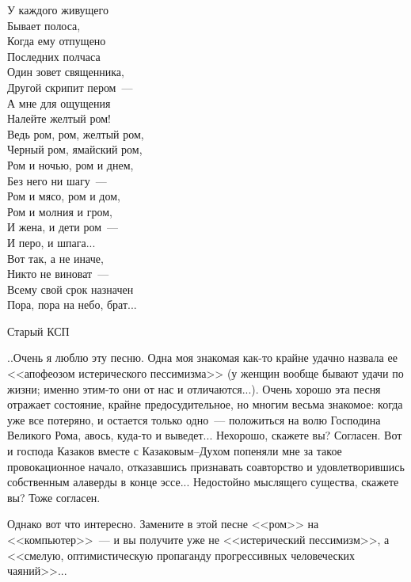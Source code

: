 \documentclass{scrbook}
\makeatletter
\newcommand{\defaultepigraphwidth}{0.5} %
\newcommand{\flqq}{<<}
\newcommand{\frqq}{>>}
\newcommand{\mdash}{~--- }
\newcommand{\ndash}{--}
\newcommand{\myepigraph}[3][\@empty]{
	\ifx\@empty#1
		\setlength{\epigraphwidth}{\defaultepigraphwidth\textwidth}
	\else
		\setlength{\epigraphwidth}{#1\textwidth}
	\fi
	\epigraph{#2}{#3}
	\setlength{\epigraphwidth}{\defaultepigraphwidth\textwidth} %
	\nopagebreak
}
\makeatother
\begin{document}
\myepigraph{У каждого живущего \\
Бывает полоса, \\
Когда ему отпущено \\
Последних полчаса \\
Один зовет священника, \\
Другой скрипит пером{\mdash}\\
А мне для ощущения \\
Налейте желтый ром! \\
Ведь ром, ром, желтый ром, \\
Черный ром, ямайский ром, \\
Ром и ночью, ром и днем, \\
Без него ни шагу{\mdash}\\
Ром и мясо, ром и дом, \\
Ром и молния и гром, \\
И жена, и дети ром{\mdash}\\
И перо, и шпага... \\
Вот так, а не иначе, \\
Никто не виноват{\mdash}\\
Всему свой срок назначен \\
Пора, пора на небо, брат...}
{Старый КСП}

..Очень я люблю эту песню. Одна моя знакомая как-то крайне удачно назвала ее {\flqq}апофеозом истерического пессимизма{\frqq} (у женщин вообще бывают удачи по жизни; именно этим-то они от нас и отличаются...). Очень хорошо эта песня отражает состояние, крайне предосудительное, но многим весьма знакомое: когда уже все потеряно, и остается только одно{\mdash}положиться на волю Господина Великого Рома, авось, куда-то и выведет... Нехорошо, скажете вы? Согласен. Вот и господа Казаков вместе с Казаковым{\ndash}Духом попеняли мне за такое провокационное начало, отказавшись признавать соавторство и удовлетворившись собственным алаверды в конце эссе... Недостойно мыслящего существа, скажете вы? Тоже согласен.

Однако вот что интересно. Замените в этой песне {\flqq}ром{\frqq} на {\flqq}компьютер{\frqq}{\mdash}и вы получите уже не {\flqq}истерический пессимизм{\frqq}, а {\flqq}смелую, оптимистическую пропаганду прогрессивных человеческих чаяний{\frqq}...
\end{document}

